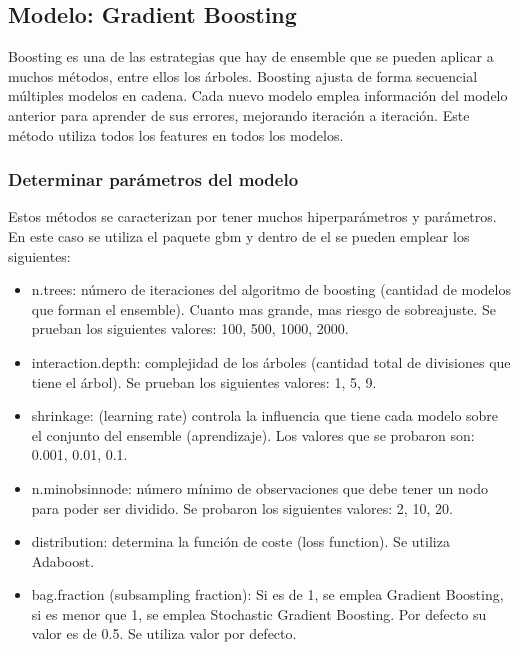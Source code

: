 \subsection{Modelo: Gradient Boosting}

Boosting es una de las estrategias que hay de ensemble que se pueden
aplicar a muchos métodos, entre ellos los árboles. Boosting ajusta de
forma secuencial múltiples modelos en cadena. Cada nuevo modelo emplea
información del modelo anterior para aprender de sus errores, mejorando
iteración a iteración. Este método utiliza todos los features en todos los modelos.


\subsubsection{Determinar parámetros del modelo}

Estos métodos se caracterizan por tener muchos hiperparámetros y
parámetros. En este caso se utiliza el paquete gbm y dentro de el se
pueden emplear los siguientes:

\begin{itemize}
	\item
	n.trees: número de iteraciones del algoritmo de boosting (cantidad de
	modelos que forman el ensemble). Cuanto mas grande, mas riesgo de
	sobreajuste. Se prueban los siguientes valores: 100, 500, 1000, 2000.
	\item
	interaction.depth: complejidad de los árboles (cantidad total de
	divisiones que tiene el árbol). Se prueban los siguientes valores: 1,
	5, 9.
	\item
	shrinkage: (learning rate) controla la influencia que tiene cada modelo
	sobre el conjunto del ensemble (aprendizaje). Los valores que se
	probaron son: 0.001, 0.01, 0.1.
	\item
	n.minobsinnode: número mínimo de observaciones que debe tener un nodo
	para poder ser dividido. Se probaron los siguientes valores: 2, 10, 20.
	\item
	distribution: determina la función de coste (loss function). Se utiliza
	Adaboost.
	\item
	bag.fraction (subsampling fraction): Si es de 1, se emplea Gradient
	Boosting, si es menor que 1, se emplea Stochastic Gradient Boosting. Por
	defecto su valor es de 0.5. Se utiliza valor por defecto.
\end{itemize}

